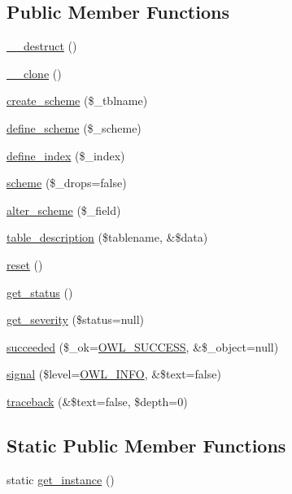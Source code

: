 \subsection*{Public Member Functions}
\begin{DoxyCompactItemize}
\item 
\hyperlink{classSchemeHandler_a3d786efe6ef92858de21438b59774226}{\_\-\_\-destruct} ()
\item 
\hyperlink{classSchemeHandler_af0a48894ea6bb36f3149ccd40bf37681}{\_\-\_\-clone} ()
\item 
\hyperlink{classSchemeHandler_ae00497936108b220b41af512774cfc16}{create\_\-scheme} (\$\_\-tblname)
\item 
\hyperlink{classSchemeHandler_a07f6b7c5ac78e88f32584b90da53776b}{define\_\-scheme} (\$\_\-scheme)
\item 
\hyperlink{classSchemeHandler_a92adefff835050da61337524b9ae907b}{define\_\-index} (\$\_\-index)
\item 
\hyperlink{classSchemeHandler_a1e843dc411d175818c7b2ab5374f021e}{scheme} (\$\_\-drops=false)
\item 
\hyperlink{classSchemeHandler_aa8948e6382f7d19302a255ff0619765c}{alter\_\-scheme} (\$\_\-field)
\item 
\hyperlink{classSchemeHandler_a236edc61301c6926449e68385cc59a99}{table\_\-description} (\$tablename, \&\$data)
\item 
\hyperlink{classSchemeHandler_aa25feb4a70d67b3d571904be4b2f50bc}{reset} ()
\item 
\hyperlink{class__OWL_a99ec771fa2c5c279f80152cc09e489a8}{get\_\-status} ()
\item 
\hyperlink{class__OWL_adf9509ef96858be7bdd9414c5ef129aa}{get\_\-severity} (\$status=null)
\item 
\hyperlink{class__OWL_a53ab4d3bbb2c6a56966c339ca4b4c805}{succeeded} (\$\_\-ok=\hyperlink{owl_8severitycodes_8php_a96223f06ba27bf5cbefa6e9d702897c2}{OWL\_\-SUCCESS}, \&\$\_\-object=null)
\item 
\hyperlink{class__OWL_a51ba4a16409acf2a2f61f286939091a5}{signal} (\$level=\hyperlink{owl_8severitycodes_8php_a139328861128689f2f4def6a399d9057}{OWL\_\-INFO}, \&\$text=false)
\item 
\hyperlink{class__OWL_aa29547995d6741b7d2b90c1d4ea99a13}{traceback} (\&\$text=false, \$depth=0)
\end{DoxyCompactItemize}
\subsection*{Static Public Member Functions}
\begin{DoxyCompactItemize}
\item 
static \hyperlink{classSchemeHandler_a02edff8af08e3e33a7571e2da8f98cc7}{get\_\-instance} ()
\end{DoxyCompactItemize}
